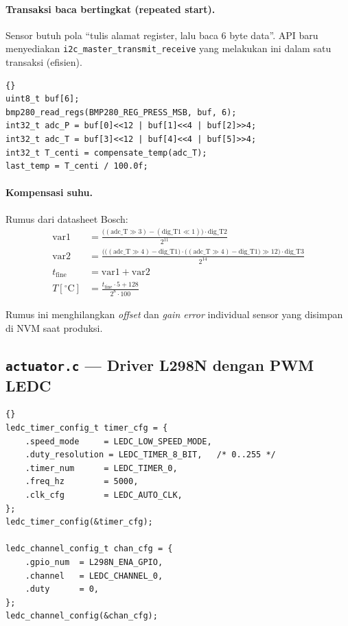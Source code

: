 \documentclass[11pt,a4paper]{article}
\begin{document}
\paragraph{Transaksi baca bertingkat (repeated start).}
Sensor butuh pola ``tulis alamat register, lalu baca 6 byte data''. API baru menyediakan \texttt{i2c\_master\_transmit\_receive} yang melakukan ini dalam satu transaksi (efisien).

\begin{lstlisting}[caption={Pembacaan suhu + tekanan}]{}
uint8_t buf[6];
bmp280_read_regs(BMP280_REG_PRESS_MSB, buf, 6);
int32_t adc_P = buf[0]<<12 | buf[1]<<4 | buf[2]>>4;
int32_t adc_T = buf[3]<<12 | buf[4]<<4 | buf[5]>>4;
int32_t T_centi = compensate_temp(adc_T);
last_temp = T_centi / 100.0f;
\end{lstlisting}

\paragraph{Kompensasi suhu.} Rumus dari datasheet Bosch:
\begin{align*}
\mathrm{var1} &= \frac{\big((\mathrm{adc\_T} \gg 3) - (\mathrm{dig\_T1} \ll 1)\big) \cdot \mathrm{dig\_T2}}{2^{11}} \\
\mathrm{var2} &= \frac{\big(\big((\mathrm{adc\_T} \gg 4) - \mathrm{dig\_T1}\big) \cdot \big((\mathrm{adc\_T} \gg 4) - \mathrm{dig\_T1}\big) \gg 12\big) \cdot \mathrm{dig\_T3}}{2^{14}} \\
t_\mathrm{fine} &= \mathrm{var1} + \mathrm{var2} \\
T\left[^{\circ}\mathrm{C}\right] &= \frac{t_\mathrm{fine} \cdot 5 + 128}{2^{8} \cdot 100}
\end{align*}

Rumus ini menghilangkan \emph{offset} dan \emph{gain error} individual sensor yang disimpan di NVM saat produksi.

\subsection{\texttt{actuator.c} --- Driver L298N dengan PWM LEDC}

\begin{lstlisting}[caption={Inisialisasi LEDC channel}]{}
ledc_timer_config_t timer_cfg = {
    .speed_mode     = LEDC_LOW_SPEED_MODE,
    .duty_resolution = LEDC_TIMER_8_BIT,   /* 0..255 */
    .timer_num      = LEDC_TIMER_0,
    .freq_hz        = 5000,
    .clk_cfg        = LEDC_AUTO_CLK,
};
ledc_timer_config(&timer_cfg);

ledc_channel_config_t chan_cfg = {
    .gpio_num  = L298N_ENA_GPIO,
    .channel   = LEDC_CHANNEL_0,
    .duty      = 0,
};
ledc_channel_config(&chan_cfg);
\end{lstlisting}
\end{document}
